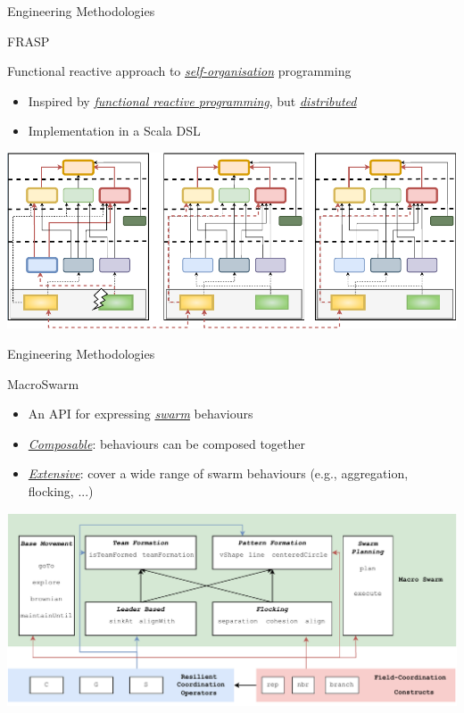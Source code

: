 \documentclass[presentation, 9pt,169]{beamer}\mode<presentation>{\usetheme{AMSBolognaFC}}
\begin{document}
\begin{frame}{Engineering Methodologies}
\begin{exampleblock}{FRASP~\cite{frasp}}
  
  Functional reactive approach to \emph{\underline{self-organisation}} programming
\begin{itemize}
  \item Inspired by \emph{\underline{functional reactive programming}}, but \emph{\underline{distributed}}
  \item Implementation in a Scala DSL
\end{itemize}
\includegraphics[width=\textwidth]{img/interactions.pdf}
\end{exampleblock}
\end{frame}
\begin{frame}{Engineering Methodologies}
\begin{exampleblock}{MacroSwarm~\cite{macroswarm}}
  \begin{itemize}
    \item An API for expressing \underline{\emph{swarm}} behaviours
    \item \emph{\underline{Composable}}: behaviours can be composed together
    \item \emph{\underline{Extensive}}: cover a wide range of swarm behaviours (e.g., aggregation, flocking, ...)
  \end{itemize}
\includegraphics[width=\textwidth]{img/architecture-macro.drawio.pdf}
\end{exampleblock}
\end{frame}
\end{document}
